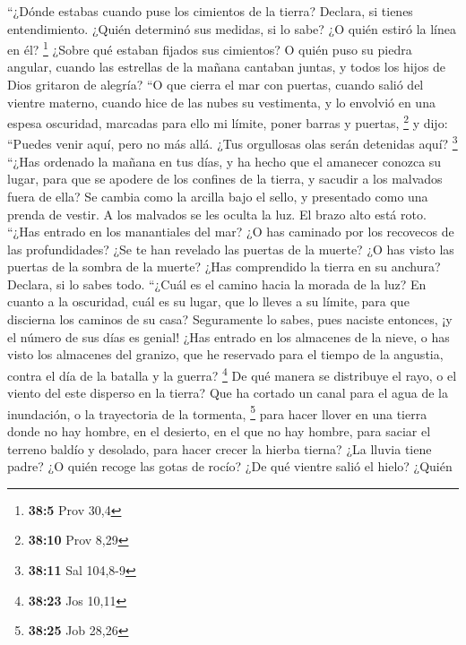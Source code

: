  ``¿Dónde estabas cuando puse los cimientos de la tierra?
Declara, si tienes entendimiento.  ¿Quién determinó sus
medidas, si lo sabe? ¿O quién estiró la línea en él? \footnote{\textbf{38:5}
  Prov 30,4}  ¿Sobre qué estaban fijados sus cimientos? O
quién puso su piedra angular,  cuando las estrellas de la
mañana cantaban juntas, y todos los hijos de Dios gritaron de alegría?
 ``O que cierra el mar con puertas, cuando salió del
vientre materno,  cuando hice de las nubes su vestimenta,
y lo envolvió en una espesa oscuridad,  marcadas para
ello mi límite, poner barras y puertas, \footnote{\textbf{38:10} Prov
  8,29}  y dijo: ``Puedes venir aquí, pero no más allá.
¿Tus orgullosas olas serán detenidas aquí? \footnote{\textbf{38:11} Sal
  104,8-9}  ``¿Has ordenado la mañana en tus días, y ha
hecho que el amanecer conozca su lugar,  para que se
apodere de los confines de la tierra, y sacudir a los malvados fuera de
ella?  Se cambia como la arcilla bajo el sello, y
presentado como una prenda de vestir.  A los malvados se
les oculta la luz. El brazo alto está roto.  ``¿Has
entrado en los manantiales del mar? ¿O has caminado por los recovecos de
las profundidades?  ¿Se te han revelado las puertas de la
muerte? ¿O has visto las puertas de la sombra de la muerte?
 ¿Has comprendido la tierra en su anchura? Declara, si lo
sabes todo.  ``¿Cuál es el camino hacia la morada de la
luz? En cuanto a la oscuridad, cuál es su lugar,  que lo
lleves a su límite, para que discierna los caminos de su casa?
 Seguramente lo sabes, pues naciste entonces, ¡y el
número de sus días es genial!  ¿Has entrado en los
almacenes de la nieve, o has visto los almacenes del granizo,
 que he reservado para el tiempo de la angustia, contra
el día de la batalla y la guerra? \footnote{\textbf{38:23} Jos 10,11}
 De qué manera se distribuye el rayo, o el viento del
este disperso en la tierra?  Que ha cortado un canal para
el agua de la inundación, o la trayectoria de la tormenta, \footnote{\textbf{38:25}
  Job 28,26}  para hacer llover en una tierra donde no
hay hombre, en el desierto, en el que no hay hombre, 
para saciar el terreno baldío y desolado, para hacer crecer la hierba
tierna?  ¿La lluvia tiene padre? ¿O quién recoge las
gotas de rocío?  ¿De qué vientre salió el hielo? ¿Quién
